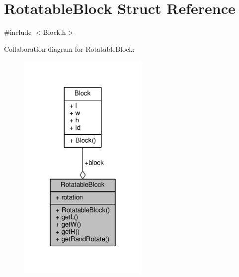 \hypertarget{structRotatableBlock}{}\section{Rotatable\+Block Struct Reference}
\label{structRotatableBlock}


{\ttfamily \#include $<$Block.\+h$>$}



Collaboration diagram for Rotatable\+Block\+:\nopagebreak
\begin{figure}[H]
\begin{center}
\leavevmode
\includegraphics[width=178pt]{structRotatableBlock__coll__graph}
\end{center}
\end{figure}
